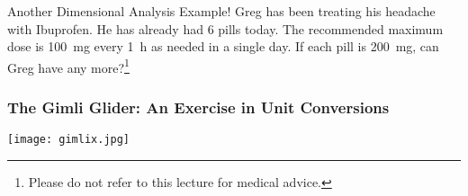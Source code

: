 \documentclass[notes=hide]{beamer}
\begin{document}
\begin{frame}[t]{Another Dimensional Analysis Example!}
	Greg has been treating his headache with Ibuprofen. He has already had 6
	pills today. The recommended maximum dose is \SI{100}{\milli\gram} every
	\SI{1}{h} as needed in a single day. If each pill is
	\SI{200}{\milli\gram}, can Greg have any more?\footnote{Please do not
	refer to this lecture for medical advice.}

\end{frame}

\begin{frame}[c]
	\frametitle{The Gimli Glider: An Exercise in Unit Conversions}
	\begin{center}
		\texttt{[image: gimlix.jpg]}
	\end{center}
\end{frame}
\end{document}
